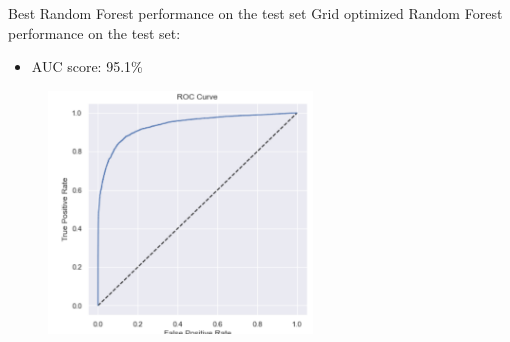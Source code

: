 
\begin{frame}{Best Random Forest performance on the test set}
Grid optimized Random Forest performance on the test set:
\begin{itemize}
  \item AUC score: 95.1\%
\end{itemize}
\begin{figure}
		\includegraphics[width=7.0cm]{figures/fig_xgboos_roc.PNG}
	\end{figure}
\end{frame}

